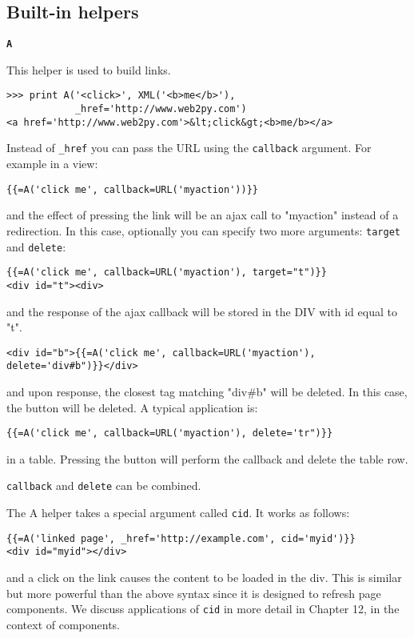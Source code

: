 \documentclass[justified,sixbynine,notoc]{tufte-book}
\def\ft{\small\tt}
\def\inxx#1{\index{#1}}
\begin{document}
\begin{fullwidth}
\goodbreak\subsection{Built-in helpers}

{\bf {\ft A}}

This helper is used to build links.

\inxx{A}
\begin{lstlisting}
>>> print A('<click>', XML('<b>me</b>'),
            _href='http://www.web2py.com')
<a href='http://www.web2py.com'>&lt;click&gt;<b>me/b></a>
\end{lstlisting}

Instead of {\ft \_href} you can pass the URL using the {\ft callback} argument. For example in a view:

\begin{lstlisting}[keywords={}]
{{=A('click me', callback=URL('myaction'))}}
\end{lstlisting}
\noindent and the effect of pressing the link will be an ajax call to "myaction" instead of a redirection.
In this case, optionally you can specify two more arguments: {\ft target} and {\ft delete}:
\begin{lstlisting}[keywords={}]
{{=A('click me', callback=URL('myaction'), target="t")}}
<div id="t"><div>
\end{lstlisting}
and the response of the ajax callback will be stored in the DIV with id equal to "t".

\begin{lstlisting}[keywords={}]
<div id="b">{{=A('click me', callback=URL('myaction'), delete='div#b")}}</div>
\end{lstlisting}
and upon response, the closest tag matching "div\#b" will be deleted. In this case, the button will be deleted.
A typical application is:

\begin{lstlisting}[keywords={}]
{{=A('click me', callback=URL('myaction'), delete='tr")}}
\end{lstlisting}
\noindent in a table. Pressing the button will perform the callback and delete the table row.

{\ft callback} and {\ft delete} can be combined.

The A helper takes a special argument called {\ft cid}. It works as follows:

\begin{lstlisting}[keywords={}]
{{=A('linked page', _href='http://example.com', cid='myid')}}
<div id="myid"></div>
\end{lstlisting}
\noindent and a click on the link causes the content to be loaded in the div. This is similar but more powerful than the above syntax since it is designed to refresh page components. We discuss applications of {\ft cid} in more detail in Chapter 12, in the context of components.


\end{fullwidth}
\end{document}
